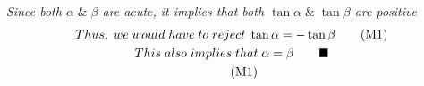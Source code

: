     \newpage
    \textit{Since both \(\alpha \;\&\; \beta\) are acute, it implies that both \(\tan{\alpha} \;\&\; \tan{\beta}\) are positive}
    \begin{gather*}
        Thus, \; we \; would \; have \; to \; reject \; \tan{\alpha} = -\tan{\beta} \onemark \\
        This \; also \; implies \; that \; \alpha = \beta \tag*{\qedsymbol} \\ \onemark
    \end{gather*}



